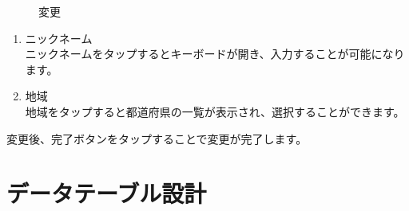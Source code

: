 \documentclass[a4j]{jarticle}
\begin{document}
\begin{figure}[H]
  \begin{center}
    \caption {変更}
    \label{change}
  \end{center}
\end{figure}

\begin{enumerate}
  \renewcommand{\labelenumi}{\textcircled{\scriptsize \theenumi}}
\item ニックネーム\\
  ニックネームをタップするとキーボードが開き、入力することが可能になります。
\item 地域\\
  地域をタップすると都道府県の一覧が表示され、選択することができます。
\end{enumerate}

変更後、完了ボタンをタップすることで変更が完了します。

\newpage
\section{データテーブル設計}
\end{document}
